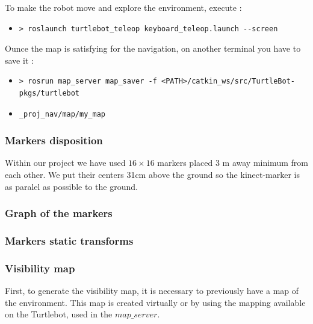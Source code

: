 \documentclass[10pt,a4paper]{article}
\begin{document}
To make the robot move and explore the environment, execute :

\begin{itemize}
\item[]  \begin{verbatim}> roslaunch turtlebot_teleop keyboard_teleop.launch --screen \end{verbatim}
\end{itemize}

Ounce the map is satisfying for the navigation, on another terminal you have to save it :

\begin{itemize}
\item[]  \begin{verbatim}> rosrun map_server map_saver -f <PATH>/catkin_ws/src/TurtleBot-pkgs/turtlebot\end{verbatim}
\item[]  \begin{verbatim}_proj_nav/map/my_map\end{verbatim}

\end{itemize}

\subsubsection{Markers disposition}
 
Within our project we have used  $16 \times 16$ markers placed 3 m away minimum from each other. We put their centers 31cm above the ground so the kinect-marker is as paralel as possible to the ground.

\subsubsection{Graph of the markers}

\subsubsection{Markers static transforms}

\subsubsection{Visibility map}

First, to generate the visibility map, it is necessary to previously have a map of the environment. This map is created virtually or by using the mapping available on the Turtlebot, used in the $ map\_server $.\\
\end{document}
